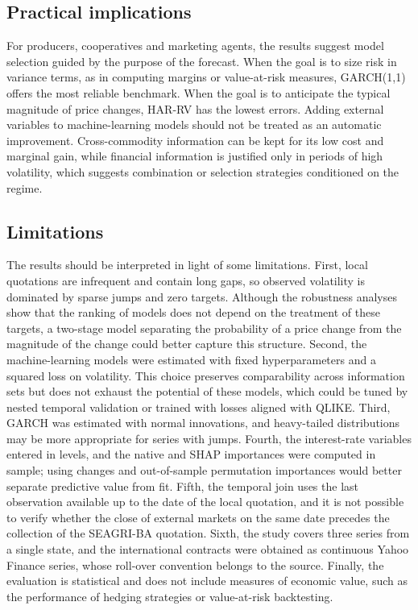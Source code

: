 \documentclass[a4paper,fleqn]{cas-sc}
\begin{document}
\subsection{Practical implications}
\label{subsec:disc_practical}

For producers, cooperatives and marketing agents, the results suggest model selection guided by the purpose of the forecast. When the goal is to size risk in variance terms, as in computing margins or value-at-risk measures, GARCH(1,1) offers the most reliable benchmark. When the goal is to anticipate the typical magnitude of price changes, HAR-RV has the lowest errors. Adding external variables to machine-learning models should not be treated as an automatic improvement. Cross-commodity information can be kept for its low cost and marginal gain, while financial information is justified only in periods of high volatility, which suggests combination or selection strategies conditioned on the regime.

\subsection{Limitations}
\label{subsec:disc_limitations}

The results should be interpreted in light of some limitations. First, local quotations are infrequent and contain long gaps, so observed volatility is dominated by sparse jumps and zero targets. Although the robustness analyses show that the ranking of models does not depend on the treatment of these targets, a two-stage model separating the probability of a price change from the magnitude of the change could better capture this structure. Second, the machine-learning models were estimated with fixed hyperparameters and a squared loss on volatility. This choice preserves comparability across information sets but does not exhaust the potential of these models, which could be tuned by nested temporal validation or trained with losses aligned with QLIKE. Third, GARCH was estimated with normal innovations, and heavy-tailed distributions may be more appropriate for series with jumps. Fourth, the interest-rate variables entered in levels, and the native and SHAP importances were computed in sample; using changes and out-of-sample permutation importances would better separate predictive value from fit. Fifth, the temporal join uses the last observation available up to the date of the local quotation, and it is not possible to verify whether the close of external markets on the same date precedes the collection of the SEAGRI-BA quotation. Sixth, the study covers three series from a single state, and the international contracts were obtained as continuous Yahoo Finance series, whose roll-over convention belongs to the source. Finally, the evaluation is statistical and does not include measures of economic value, such as the performance of hedging strategies or value-at-risk backtesting.
\end{document}
